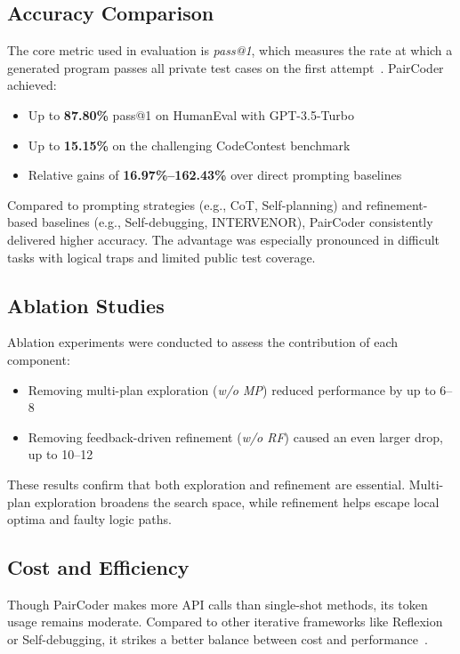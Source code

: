 \documentclass[11pt,a4paper]{article}
\begin{document}
\subsection{Accuracy Comparison}
The core metric used in evaluation is \textit{pass@1}, which measures the rate at which a generated program passes all private test cases on the first attempt~\cite{zhang2024paircoder}. PairCoder achieved:
\begin{itemize}
\item Up to \textbf{87.80\%} pass@1 on HumanEval with GPT-3.5-Turbo
\item Up to \textbf{15.15\%} on the challenging CodeContest benchmark
\item Relative gains of \textbf{16.97\%–162.43\%} over direct prompting baselines
\end{itemize}

Compared to prompting strategies (e.g., CoT, Self-planning) and refinement-based baselines (e.g., Self-debugging, INTERVENOR), PairCoder consistently delivered higher accuracy. The advantage was especially pronounced in difficult tasks with logical traps and limited public test coverage.

\subsection{Ablation Studies}
Ablation experiments were conducted to assess the contribution of each component:
\begin{itemize}
\item Removing multi-plan exploration (\textit{w/o MP}) reduced performance by up to 6–8%
\item Removing feedback-driven refinement (\textit{w/o RF}) caused an even larger drop, up to 10–12%
\end{itemize}

These results confirm that both exploration and refinement are essential. Multi-plan exploration broadens the search space, while refinement helps escape local optima and faulty logic paths.

\subsection{Cost and Efficiency}
Though PairCoder makes more API calls than single-shot methods, its token usage remains moderate. Compared to other iterative frameworks like Reflexion or Self-debugging, it strikes a better balance between cost and performance~\cite{zhang2024paircoder}.
\end{document}
